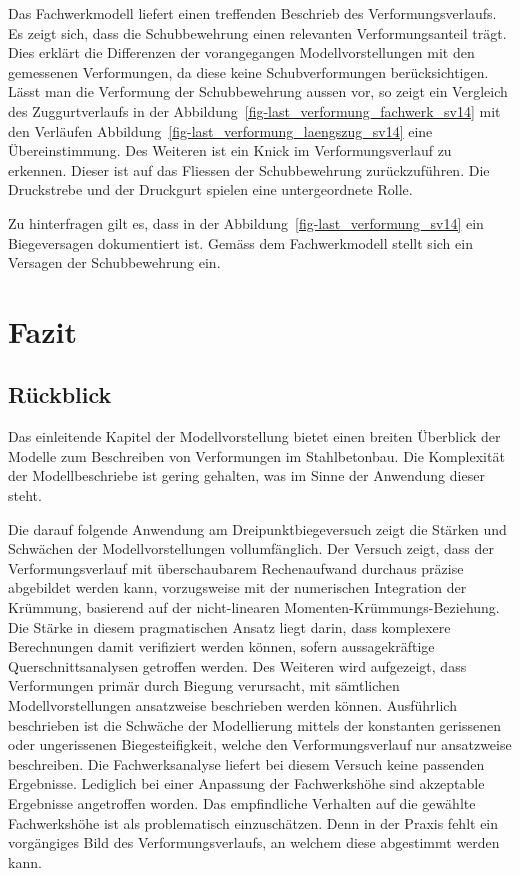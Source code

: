 \documentclass[
  12pt,
  letterpaper,
  egregdoesnotlikesansseriftitles]{scrreprt}
\begin{document}
Das Fachwerkmodell liefert einen treffenden Beschrieb des
Verformungsverlaufs. Es zeigt sich, dass die Schubbewehrung einen
relevanten Verformungsanteil trägt. Dies erklärt die Differenzen der
vorangegangen Modellvorstellungen mit den gemessenen Verformungen, da
diese keine Schubverformungen berücksichtigen. Lässt man die Verformung
der Schubbewehrung aussen vor, so zeigt ein Vergleich des
Zuggurtverlaufs in der Abbildung~\ref{fig-last_verformung_fachwerk_sv14}
mit den Verläufen Abbildung~\ref{fig-last_verformung_laengszug_sv14}
eine Übereinstimmung. Des Weiteren ist ein Knick im Verformungsverlauf
zu erkennen. Dieser ist auf das Fliessen der Schubbewehrung
zurückzuführen. Die Druckstrebe und der Druckgurt spielen eine
untergeordnete Rolle.

Zu hinterfragen gilt es, dass in der
Abbildung~\ref{fig-last_verformung_sv14} ein Biegeversagen dokumentiert
ist. Gemäss dem Fachwerkmodell stellt sich ein Versagen der
Schubbewehrung ein.


\chapter{Fazit}\label{fazit}

\section{Rückblick}\label{ruxfcckblick}

Das einleitende Kapitel der Modellvorstellung bietet einen breiten
Überblick der Modelle zum Beschreiben von Verformungen im Stahlbetonbau.
Die Komplexität der Modellbeschriebe ist gering gehalten, was im Sinne
der Anwendung dieser steht.

Die darauf folgende Anwendung am Dreipunktbiegeversuch zeigt die Stärken
und Schwächen der Modellvorstellungen vollumfänglich. Der Versuch zeigt,
dass der Verformungsverlauf mit überschaubarem Rechenaufwand durchaus
präzise abgebildet werden kann, vorzugsweise mit der numerischen
Integration der Krümmung, basierend auf der nicht-linearen
Momenten-Krümmungs-Beziehung. Die Stärke in diesem pragmatischen Ansatz
liegt darin, dass komplexere Berechnungen damit verifiziert werden
können, sofern aussagekräftige Querschnittsanalysen getroffen werden.
Des Weiteren wird aufgezeigt, dass Verformungen primär durch Biegung
verursacht, mit sämtlichen Modellvorstellungen ansatzweise beschrieben
werden können. Ausführlich beschrieben ist die Schwäche der Modellierung
mittels der konstanten gerissenen oder ungerissenen Biegesteifigkeit,
welche den Verformungsverlauf nur ansatzweise beschreiben. Die
Fachwerksanalyse liefert bei diesem Versuch keine passenden Ergebnisse.
Lediglich bei einer Anpassung der Fachwerkshöhe sind akzeptable
Ergebnisse angetroffen worden. Das empfindliche Verhalten auf die
gewählte Fachwerkshöhe ist als problematisch einzuschätzen. Denn in der
Praxis fehlt ein vorgängiges Bild des Verformungsverlaufs, an welchem
diese abgestimmt werden kann.
\end{document}
